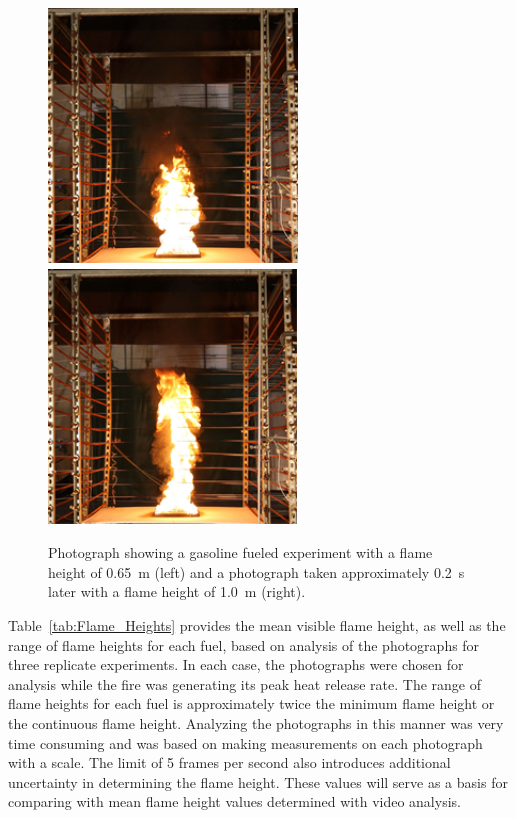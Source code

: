 \documentclass[twoside]{uocthesis}
\begin{document}
{\begin{figure}
  \includegraphics[width=2.6in]{../Figures/Gaso_0_65m}
  \includegraphics[width=2.6in]{../Figures/Gaso_1_0m} \\
  \caption[Photographs of the gasoline fire]{Photograph showing a gasoline fueled experiment with a flame height of 0.65~m (left) and a photograph taken approximately 0.2~s later with a flame height of 1.0~m (right).}
  \label{Gasoline_Photos}
\end{figure}


Table~\ref{tab:Flame_Heights} provides the mean visible flame height, as well as the range of flame heights for each fuel, based on analysis of the photographs for three replicate experiments.  In each case, the photographs were chosen for analysis while the fire was generating its peak heat release rate.  The range of flame heights for each fuel is approximately twice the minimum flame height or the continuous flame height. Analyzing the photographs in this manner was very time consuming and was based on making measurements on each photograph with a scale.  The limit of 5 frames per second also introduces additional uncertainty in determining the flame height. These values will serve as a basis for comparing with mean flame height values determined with video analysis.

}
\end{document}
